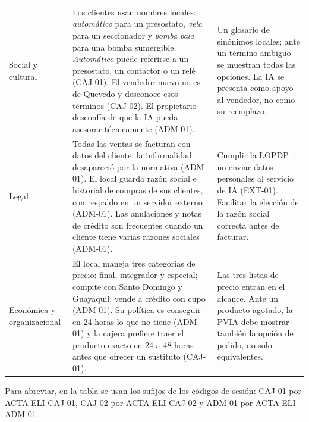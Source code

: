\begin{longtable}{@{}L{2.2cm}L{6.6cm}L{4.9cm}@{}}
Social y cultural & Los clientes usan nombres locales: \emph{automático} para un presostato, \emph{vela} para un seccionador y \emph{bomba bala} para una bomba sumergible. \emph{Automático} puede referirse a un presostato, un contactor o un relé (CAJ-01). El vendedor nuevo no es de Quevedo y desconoce esos términos (CAJ-02). El propietario desconfía de que la IA pueda asesorar técnicamente (ADM-01). & Un glosario de sinónimos locales; ante un término ambiguo se muestran todas las opciones. La IA se presenta como apoyo al vendedor, no como su reemplazo. \\
Legal & Todas las ventas se facturan con datos del cliente; la informalidad desapareció por la normativa (ADM-01). El local guarda razón social e historial de compras de sus clientes, con respaldo en un servidor externo (ADM-01). Las anulaciones y notas de crédito son frecuentes cuando un cliente tiene varias razones sociales (ADM-01). & Cumplir la LOPDP~\cite{lopdp2021}: no enviar datos personales al servicio de IA (EXT-01). Facilitar la elección de la razón social correcta antes de facturar. \\
Económica y organizacional & El local maneja tres categorías de precio: final, integrador y especial; compite con Santo Domingo y Guayaquil; vende a crédito con cupo (ADM-01). Su política es conseguir en 24 horas lo que no tiene (ADM-01) y la cajera prefiere traer el producto exacto en 24 a 48 horas antes que ofrecer un sustituto (CAJ-01). & Las tres listas de precio entran en el alcance. Ante un producto agotado, la PVIA debe mostrar también la opción de pedido, no solo equivalentes. \\
\end{longtable}
\normalsize

Para abreviar, en la tabla se usan los sufijos de los códigos de sesión: CAJ-01 por ACTA-ELI-CAJ-01, CAJ-02 por ACTA-ELI-CAJ-02 y ADM-01 por ACTA-ELI-ADM-01.
